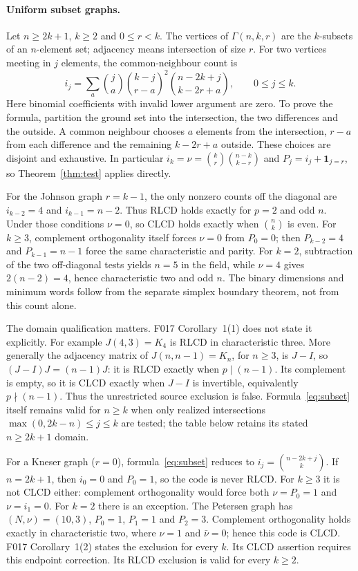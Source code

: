 \documentclass[11pt]{article}
\begin{document}
\paragraph{Uniform subset graphs.}
Let $n\geq2k+1$, $k\geq2$ and $0\leq r<k$. The vertices of $\Gamma(n,k,r)$
are the $k$-subsets of an $n$-element set; adjacency means intersection of
size $r$. For two vertices meeting in $j$ elements, the common-neighbour
count is
\begin{equation}\label{eq:subset}
 i_j=\sum_a\binom ja\binom{k-j}{r-a}^{\!2}
                  \binom{n-2k+j}{k-2r+a},\qquad 0\leq j\leq k.
\end{equation}
Here binomial coefficients with invalid lower argument are zero.
To prove the formula, partition the ground set into the intersection,
the two differences and the outside. A common neighbour chooses $a$
elements from the intersection, $r-a$ from each difference and the remaining
$k-2r+a$ outside. These choices are disjoint and exhaustive.
In particular $i_k=\nu=\binom kr\binom{n-k}{k-r}$ and
$P_j=i_j+\mathbf1_{j=r}$, so Theorem~\ref{thm:test} applies directly.

For the Johnson graph $r=k-1$, the only nonzero counts off the diagonal
are $i_{k-2}=4$ and $i_{k-1}=n-2$. Thus RLCD holds exactly for $p=2$ and
odd $n$. Under those conditions $\nu=0$, so CLCD holds exactly when
$\binom nk$ is even. For $k\geq3$, complement orthogonality itself forces
$\nu=0$ from $P_0=0$;
then $P_{k-2}=4$ and $P_{k-1}=n-1$ force the same characteristic and parity.
For $k=2$, subtraction of the two off-diagonal tests yields $n=5$ in the
field, while $\nu=4$ gives $2(n-2)=4$, hence characteristic two and odd $n$.
The binary dimensions and minimum words follow from the separate simplex
boundary theorem, not from this count alone.

The domain qualification matters. F017 Corollary~1(1) does not state it
explicitly. For example $J(4,3)=K_4$ is RLCD in characteristic three.
More generally the adjacency matrix of $J(n,n-1)=K_n$, for $n\geq3$, is
$J-I$, so $(J-I)J=(n-1)J$: it is RLCD exactly when $p\mid(n-1)$.
Its complement is empty, so it is CLCD exactly when $J-I$ is invertible,
equivalently $p\nmid(n-1)$. Thus the unrestricted source exclusion is false.
Formula~\eqref{eq:subset} itself remains valid for $n\geq k$ when only
realized intersections $\max(0,2k-n)\leq j\leq k$ are tested; the table
below retains its stated $n\geq2k+1$ domain.

For a Kneser graph ($r=0$), formula~\eqref{eq:subset} reduces to
$i_j=\binom{n-2k+j}{k}$. If $n=2k+1$, then $i_0=0$ and $P_0=1$, so the
code is never RLCD. For $k\geq3$ it is not CLCD either: complement
orthogonality would force both $\nu=P_0=1$ and $\nu=i_1=0$.
For $k=2$ there is an exception. The Petersen graph has $(N,\nu)=(10,3)$,
$P_0=1$, $P_1=1$ and $P_2=3$. Complement orthogonality holds exactly
in characteristic two, where $\nu=1$ and $\bar\nu=0$; hence this code
is CLCD. F017 Corollary~1(2) states the exclusion for every $k$.
Its CLCD assertion requires this endpoint correction. Its RLCD exclusion
is valid for every $k\geq2$.
\end{document}
